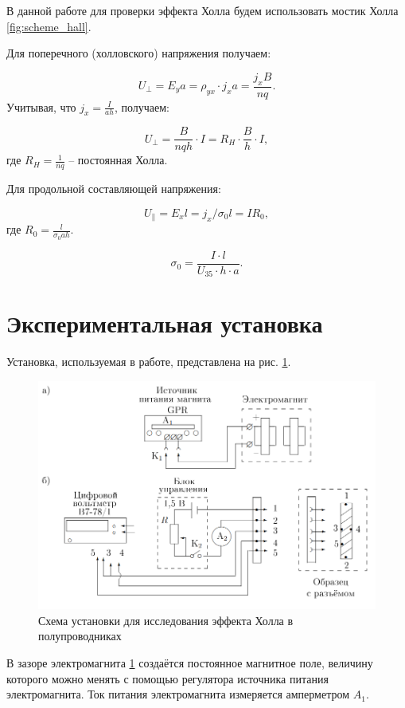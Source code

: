 \documentclass[12pt,a4paper]{article}
\begin{document}
В данной работе для проверки эффекта Холла будем использовать мостик Холла \ref{fig:scheme_hall}.

Для поперечного (холловского) напряжения получаем:

$$ U_\perp = E_y a = \rho_{yx} \cdot j_x a= \frac{j_x B}{n q}. $$
Учитывая, что $j_x = \frac{I}{ah}$, получаем:

\begin{equation}
	\label{U_perp}
	U_\perp = \frac{B}{nqh} \cdot I = R_H \cdot \frac{B}{h} \cdot I,
\end{equation}
где $R_H = \frac{1}{nq}$ -- постоянная Холла.

Для продольной составляющей напряжения:

$$ U_\parallel = E_x l = j_x / \sigma_0 l = I R_0, $$
где $R_0 = \frac{l}{\sigma_0 a h}$.

\begin{equation}
	\label{sigma_0}
	\sigma_0 = \frac{I \cdot l}{U_{35} \cdot h \cdot a}.
\end{equation}


\section*{Экспериментальная установка}

Установка, используемая в работе, представлена на рис. \ref{fig:scheme}.

\begin{figure}[H]
    \centering
	\includegraphics[width = 10 cm]{res/scheme.png}
	\caption{Схема установки для исследования эффекта Холла в полупроводниках}
	\label{fig:scheme}
\end{figure}

В зазоре электромагнита \ref{fig:scheme} создаётся постоянное магнитное поле, величину которого можно менять с помощью регулятора источника питания электромагнита. Ток питания электромагнита измеряется амперметром $A_1$.
\end{document}
